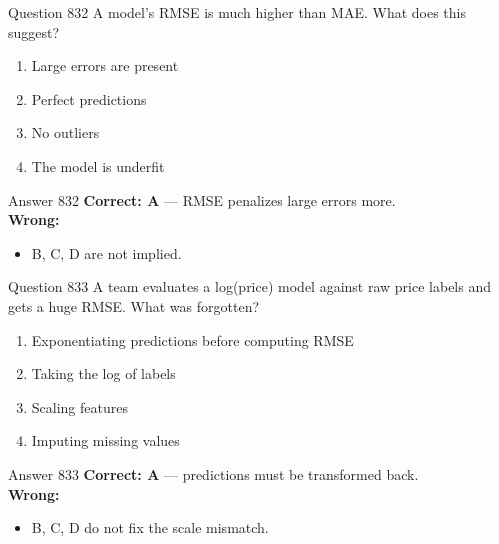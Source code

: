 \documentclass[aspectratio=169,11pt]{beamer}
\begin{document}
	\begin{frame}{Question 832}
		A model's RMSE is much higher than MAE. What does this suggest?
		\begin{enumerate}[label=\Alph*.]
			\item Large errors are present
			\item Perfect predictions
			\item No outliers
			\item The model is underfit
		\end{enumerate}
	\end{frame}
	\begin{frame}{Answer 832}
		\textbf{Correct: A} --- RMSE penalizes large errors more.\\
		\vspace{0.5em}
		\textbf{Wrong:}
		\begin{itemize}
			\item B, C, D are not implied.
		\end{itemize}
	\end{frame}
	
	\begin{frame}{Question 833}
		A team evaluates a log(price) model against raw price labels and gets a huge RMSE. What was forgotten?
		\begin{enumerate}[label=\Alph*.]
			\item Exponentiating predictions before computing RMSE
			\item Taking the log of labels
			\item Scaling features
			\item Imputing missing values
		\end{enumerate}
	\end{frame}
	\begin{frame}{Answer 833}
		\textbf{Correct: A} --- predictions must be transformed back.\\
		\vspace{0.5em}
		\textbf{Wrong:}
		\begin{itemize}
			\item B, C, D do not fix the scale mismatch.
		\end{itemize}
	\end{frame}
	
\end{document}

